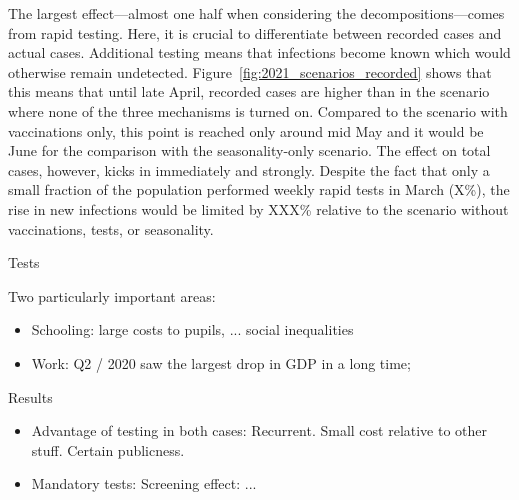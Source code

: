 The largest effect---almost one half when considering the decompositions---comes from
rapid testing. Here, it is crucial to differentiate between recorded cases and actual
cases. Additional testing means that infections become known which would otherwise
remain undetected. Figure~\ref{fig:2021_scenarios_recorded} shows that this means that
until late April, recorded cases are higher than in the scenario where none of the three
mechanisms is turned on. Compared to the scenario with vaccinations only, this point is
reached only around mid May and it would be June for the comparison with the
seasonality-only scenario. The effect on total cases, however, kicks in immediately and
strongly. Despite the fact that only a small fraction of the population performed weekly
rapid tests in March (X\%), the rise in new infections would be
limited by XXX\% relative to the scenario without vaccinations, tests, or seasonality.

Tests



\clearpage

Two particularly important areas:
\begin{itemize}
    \item Schooling: large costs to pupils, ... social inequalities
    \item Work: Q2 / 2020 saw the largest drop in GDP in a long time;
\end{itemize}

Results
\begin{itemize}
    \item Advantage of testing in both cases: Recurrent. Small cost relative to other
    stuff. Certain publicness.
    \item Mandatory tests: Screening effect: ...
\end{itemize}


